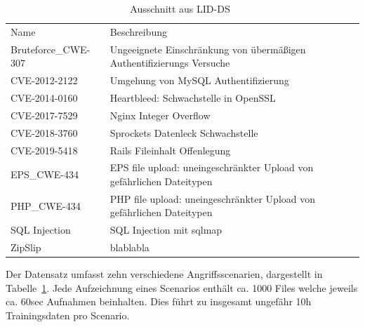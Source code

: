             \begin{table}[ht]
                \small
                \centering
                \begin{tabular}{p{3cm}|p{6.5cm}}
                    \rowcolor{Gray!36}
                    \hline
                    \multicolumn{2}{c}{Scenarien}\\
                    \hline
                    Name & Beschreibung \\
                    \rowcolor{Gray!16}
                    \hline
                    \hline
                    Bruteforce\_CWE-307 & Ungeeignete Einschränkung von übermäßigen Authentifizierungs Versuche \\
                    \hline
                    CVE-2012-2122 & Umgehung von MySQL Authentifizierung\\
                    \rowcolor{Gray!16}
                    \hline
                    CVE-2014-0160 & Heartbleed: Schwachstelle in OpenSSL\\
                    \hline
                    CVE-2017-7529 & Nginx Integer Overflow \\
                    \rowcolor{Gray!16}
                    \hline
                    CVE-2018-3760 & Sprockets Datenleck Schwachstelle \\
                    \hline
                    CVE-2019-5418 & Rails Fileinhalt Offenlegung \\
                    \rowcolor{Gray!16}
                    \hline
                    EPS\_CWE-434 & EPS file upload: uneingeschränkter Upload von gefährlichen Dateitypen  \\
                    \hline
                    PHP\_CWE-434 & PHP file upload: uneingeschränkter Upload von gefährlichen Dateitypen  \\
                    \rowcolor{Gray!16}
                    \hline
                    SQL Injection & SQL Injection mit sqlmap\\
                    \hline
                    ZipSlip & blablabla \\
                \end{tabular}
                \caption{Ausschnitt aus LID-DS~\cite{LIDDS}}
                \label{tab:scenarien}
            \end{table}
            Der Datensatz umfasst zehn verschiedene Angriffsscenarien, dargestellt in Tabelle~\ref{tab:scenarien}.
            Jede Aufzeichnung eines Scenarios enthält ca. 1000 Files welche jeweils ca. 60sec Aufnahmen beinhalten.
            Dies führt zu insgesamt ungefähr 10h Trainingsdaten pro Scenario.

